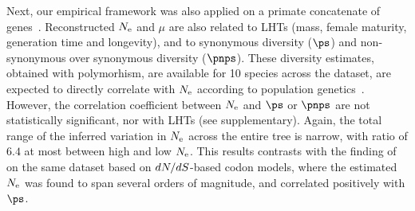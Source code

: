 \documentclass{MBE}
\begin{document}
	Next, our empirical framework was also applied on a primate concatenate of genes~\citep{Brevet2019}.
	Reconstructed $N_{\text{e}}$ and $\mu$ are also related to {LHT}s (mass, female maturity, generation time and longevity), and to {synonymous} diversity ($\ps$) and {non-synonymous} over {synonymous} diversity ($\pnps$).
	These diversity estimates, obtained with polymorhism, are available for 10 species across the dataset, are expected to directly correlate with $N_{\text{e}}$ according to population genetics~\citep{Eyre-walker2007, Galtier2016}.
	However, the correlation coefficient between $N_{\text{e}}$ and $\ps$ or $\pnps$ are not statistically significant, nor with {LHT}s (see supplementary).
	Again, the total range of the inferred variation in $N_{\text{e}}$ across the entire tree is narrow, with ratio of $6.4$ at most between high and low $N_{\text{e}}$.
	This results contrasts with the finding of \citet{Brevet2019} on the same dataset based on $dN/dS$-based {codon} models, where the estimated $N_{\text{e}}$ was found to span several orders of magnitude, and correlated positively with $\ps$.
\end{document}

